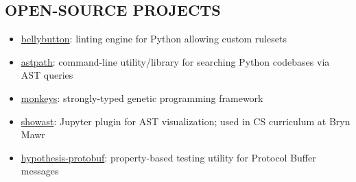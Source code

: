 \documentclass[line, margin]{res}
\begin{document}
\begin{resume}
\section{OPEN-SOURCE PROJECTS}
\begin{itemize}[leftmargin=10pt]
\item \href{https://github.com/hchasestevens/bellybutton}{bellybutton}: linting engine for Python allowing custom rulesets
\item \href{https://github.com/hchasestevens/astpath}{astpath}: command-line utility/library for searching Python codebases via AST queries
\item \href{https://github.com/hchasestevens/monkeys}{monkeys}: strongly-typed genetic programming framework
\item \href{https://github.com/hchasestevens/show_ast}{showast}: Jupyter plugin for AST visualization; used in CS curriculum at Bryn Mawr
\item \href{https://github.com/hchasestevens/hypothesis-protobuf}{hypothesis-protobuf}: property-based testing utility for Protocol Buffer messages
\end{itemize}
\end{resume}
\end{document}
